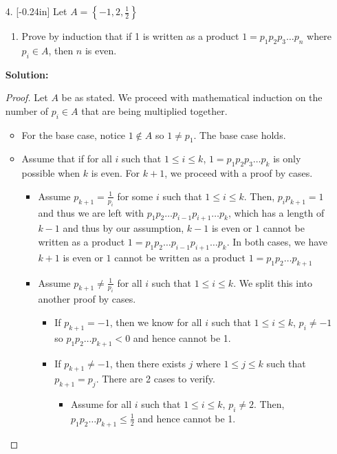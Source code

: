 \documentclass[letterpaper,12pt]{article}
\newcommand{\set}[1]{\left\{ #1 \right\}}
\theoremstyle{definition}
\begin{document}
\begin{enumerate}
    \item[4.]\reversemarginpar{}[-0.24in] 
 Let $A = \set{-1, 2, \frac{1}{2}}$
 \begin{enumerate}
     \item  Prove by induction that if 1 is written as a product $1=p_1p_2p_3\ldots p_n$ where $p_i \in A$, then $n$ is even. 
 \end{enumerate}
 \begin{mdframed}
     \textbf{Solution:}
     \begin{proof}
         Let $A$ be as stated. We proceed with mathematical induction on the number of $p_i \in A$ that are being multiplied together. \begin{itemize}
             \item For the base case, notice $1 \notin A$ so $1 \neq p_1$. The base case holds.
             \item Assume that if for all $i$ such that $1 \leq i \leq k$, $1=p_1p_2p_3\ldots p_k$ is only possible when $k$ is even. For $k +1$, we proceed with a proof by cases.
             \begin{itemize}
                 \item Assume $p_{k+1} = \frac{1}{p_i}$ for some $i$ such that $1 \leq i \leq k$. Then, $p_i p_{k+1} = 1$ and thus we are left with $p_1p_2 \ldots p_{i-1}p_{i+1} \ldots p_k$, which has a length of $k-1$ and thus by our assumption, $k-1$ is even or $1$ cannot be written as a product $1 = p_1p_2 \ldots p_{i-1}p_{i+1} \ldots p_k$. In both cases, we have $k+1$ is even or $1$ cannot be written as a product $1 = p_1p_2 \ldots p_{k+1}$
                 \item Assume $p_{k+1} \neq \frac{1}{p_i}$ for all $i$ such that $1 \leq i \leq k$. We split this into another proof by cases. \begin{itemize}
                     \item If $p_{k+1} = -1$, then we know for all $i$ such that $1 \leq i \leq k$, $p_i \neq -1$ so $p_1p_2 \ldots p_{k+1} < 0$ and hence cannot be 1.
                     \item If $p_{k+1} \neq -1$, then there exists $j$ where $1 \leq j \leq k$ such that $p_{k+1} = p_j$. There are 2 cases to verify. \begin{itemize}
                         \item Assume for all $i$ such that $1 \leq i \leq k$, $p_i \neq 2$. Then, $p_1p_2 \ldots p_{k+1} \leq \frac{1}{2}$ and hence cannot be 1.

\end{itemize}
\end{itemize}
\end{itemize}
\end{itemize}
\end{proof}
\end{mdframed}
\end{enumerate}
\end{document}
